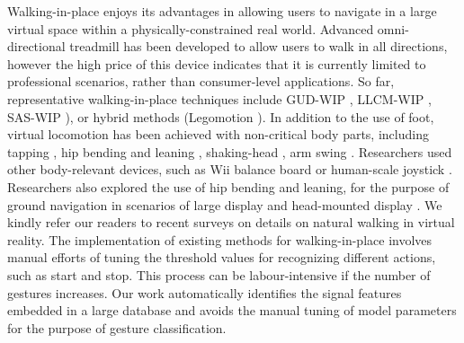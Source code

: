 \documentclass[review]{vgtc}                 %
\begin{document}
Walking-in-place enjoys its advantages in allowing users to navigate in a large virtual space within a physically-constrained real world.
Advanced omni-directional treadmill has been developed to allow users to walk in all directions, however the high price of this device indicates that it is currently limited to professional scenarios, rather than consumer-level applications.
So far, representative walking-in-place techniques include GUD-WIP \cite{wendt2010gud}, LLCM-WIP \cite{feasel2008llcm}, SAS-WIP \cite{bruno2013new}), or hybrid methods (Legomotion \cite{bhandari2017legomotion}).
In addition to the use of foot, virtual locomotion has been achieved with non-critical body parts, including tapping \cite{nilsson2013tapping}, hip bending and leaning \cite{langbehn2015evaluation,guy2015lazynav,punpongsanon2017extended}, shaking-head \cite{terziman2010shake}, arm swing \cite{nilsson2013perceived}.
Researchers used other body-relevant devices, such as Wii balance board \cite{de2008using} or human-scale joystick \cite{marchal2011joyman}.
Researchers also explored the use of hip bending and leaning, for the purpose of ground navigation in scenarios of large display \cite{guy2015lazynav} and head-mounted display \cite{punpongsanon2017extended}.
We kindly refer our readers to recent surveys \cite{nilsson2016walking,nilsson2018natural} on details on natural walking in virtual reality.
The implementation of existing methods for walking-in-place involves manual efforts of tuning the threshold values for recognizing different actions, such as start and stop.
This process can be labour-intensive if the number of gestures increases.
Our work automatically identifies the signal features embedded in a large database and avoids the manual tuning of model parameters for the purpose of gesture classification. 
\end{document}
